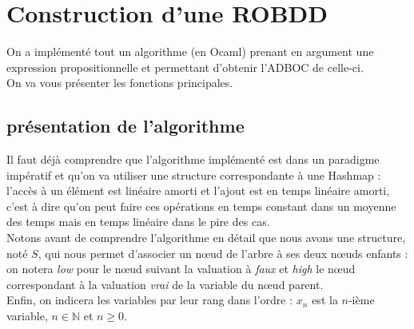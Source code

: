 \documentclass[a4paper, oneside]{report}
\begin{document}
\chapter{Construction d'une ROBDD}

On a implémenté tout un algorithme (en Ocaml) prenant en argument une expression propositionnelle et permettant d'obtenir l'ADBOC de celle-ci.\\
On va vous présenter les fonctions principales.

\section{présentation de l'algorithme}

Il faut déjà comprendre que l'algorithme implémenté est dans un paradigme impératif et qu'on va utiliser une structure correspondante à une Hashmap : l'accès à un élément est linéaire amorti et l'ajout est en temps linéaire amorti, c'est à dire qu'on peut faire ces opérations en temps constant dans un moyenne des temps mais en temps linéaire dans le pire des cas.\\
Notons avant de comprendre l'algorithme en détail que nous avons une structure, noté $S$, qui nous permet d'associer un nœud de l'arbre à ses deux nœuds enfants : on notera \textit{low} pour le nœud suivant la valuation à \textit{faux} et \textit{high} le nœud correspondant à la valuation \textit{vrai} de la variable du nœud parent.\\
Enfin, on indicera les variables par leur rang dans l'ordre : $x_n$ est la $n$-ième variable, $n\in \mathbb{N}$ et $n\geq 0$.\\
\end{document}
